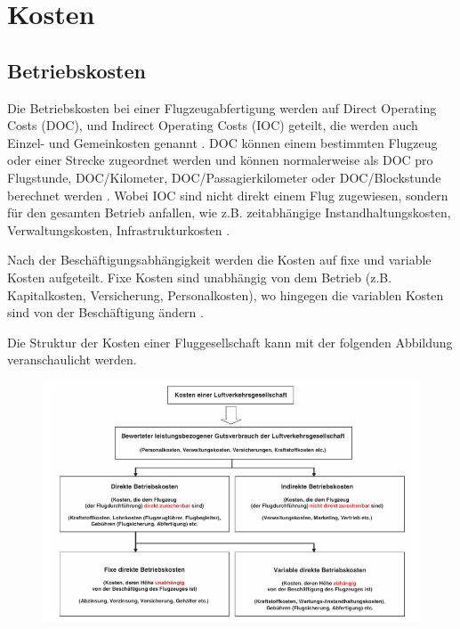 \section{Kosten}



\subsection{Betriebskosten}

Die Betriebskosten bei einer Flugzeugabfertigung werden auf Direct Operating Costs (DOC), und Indirect Operating Costs 
(IOC) geteilt, die werden auch Einzel- und Gemeinkosten genannt \cite{conrady2019luftverkehr}. 
DOC können einem bestimmten Flugzeug oder einer Strecke zugeordnet 
werden und können normalerweise als DOC pro Flugstunde, DOC/Kilometer, DOC/Passagierkilometer oder DOC/Blockstunde 
berechnet werden \cite{mensen2013handbuch}. 
Wobei IOC sind nicht direkt einem Flug zugewiesen, sondern für den gesamten Betrieb anfallen, wie z.B. zeitabhängige 
Instandhaltungskosten, Verwaltungskosten, Infrastrukturkosten \cite{mensen2013handbuch}. 

Nach der Beschäftigungsabhängigkeit werden die Kosten auf fixe und variable Kosten aufgeteilt. 
Fixe Kosten sind unabhängig von dem Betrieb (z.B. Kapitalkosten, Versicherung, Personalkosten), 
wo hingegen die variablen Kosten sind von der Beschäftigung ändern \cite{mensen2013handbuch}.



Die Struktur der Kosten einer Fluggesellschaft kann mit der folgenden Abbildung veranschaulicht werden.

\begin{figure}[h]
	\centering
	\includegraphics[width=0.9\linewidth]{Bilder/Systematik der DOC_Berechnung.png}
	\caption[DOC]{ \cite{mensen2013handbuch}}
	\label{doc}
\end{figure}


